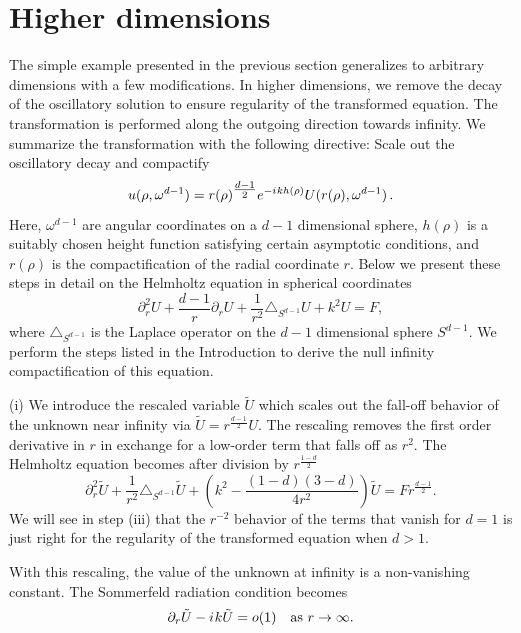 \documentclass[draft,onefignum,onetabnum]{siamart190516}
\newcommand{\be}{\begin{equation}}
\newcommand{\ee}{\end{equation}}
\newcommand{\iu}{{i\mkern1mu}}
\begin{document}
\section{Higher dimensions}\label{sec:nic}
The simple example presented in the previous section generalizes to arbitrary dimensions with a few modifications. In higher dimensions, we remove the decay of the oscillatory solution to ensure regularity of the transformed equation. The transformation is performed along the outgoing direction towards infinity. We summarize the transformation with the following directive: Scale out the oscillatory decay and compactify
\be\label{eq:summary} u(\rho, \omega^{d-1}) = r(\rho)^{\tfrac{d-1}{2}} e^{-\iu k h(\rho)} U(r(\rho), \omega^{d-1})\,.\ee
Here, $\omega^{d-1}$ are angular coordinates on a $d-1$ dimensional sphere, $h(\rho)$ is a suitably chosen height function satisfying certain asymptotic conditions, and $r(\rho)$ is the compactification of the radial coordinate $r$. Below we present these steps in detail on the Helmholtz equation in spherical coordinates
\begin{equation}\label{eq:helm_sph}
	\partial_r^2 U + \frac{d-1}{r} \partial_r U + \frac{1}{r^2}\triangle_{S^{d-1}} U + k^2 U = F,
\end{equation}
where $\triangle_{S^{d-1}}$ is the Laplace operator on the $d-1$ dimensional sphere $S^{d-1}$. We perform the steps listed in the Introduction to derive the null infinity compactification of this equation.

(i) We introduce the rescaled variable $\tilde{U}$ which scales out the fall-off behavior of the unknown near infinity via $\tilde{U} = r^{\tfrac{d-1}{2}} U$. The rescaling removes the first order derivative in $r$ in exchange for a low-order term that falls off as $r^2$. The Helmholtz equation becomes after division by $r^{\tfrac{1-d}{2}}$
\[ \partial_r^2 \tilde{U} + \frac{1}{r^2}\triangle_{S^{d-1}} \tilde{U} + \left(k^2 - \frac{(1-d)(3-d)}{4 r^2} \right) \tilde{U} = F r^{\tfrac{d-1}{2}}. \]
We will see in step (iii) that the $r^{-2}$ behavior of the terms that vanish for $d=1$ is just right for the regularity of the transformed equation when $d>1$. 

With this rescaling, the value of the unknown at infinity is a non-vanishing constant. The Sommerfeld radiation condition becomes
\[ \partial_r \tilde{U} - \iu k \tilde{U} = o(1) \quad \mathrm{as} \ r\to\infty. \]
\end{document}
